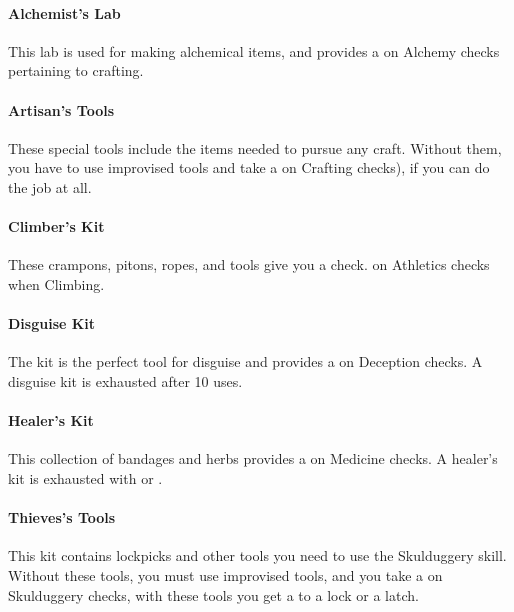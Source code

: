 \begin{multicols}{2}

\paragraph{Alchemist's Lab} \label{kititm:alchemistslab}
This lab is used for making alchemical items, and
provides a \boost on Alchemy checks pertaining to crafting.

\paragraph{Artisan's Tools} \label{kititm:artisanstools}
These special tools include the items needed to pursue
any craft. Without them, you have to use improvised
tools and take a \setback on Crafting checks), if you
can do the job at all.

\paragraph{Climber's Kit} \label{kititm:climberskit}
These crampons, pitons, ropes, and tools give you a \boost check.
on Athletics checks when Climbing.

\paragraph{Disguise Kit} \label{kititm:disguisekit}
The kit is the perfect tool for disguise and provides a \boost
on Deception checks. A disguise kit is exhausted after
10 uses.

\paragraph{Healer's Kit} \label{kititm:healerskit}
This collection of bandages and herbs provides a \boost on
Medicine checks. A healer's kit is exhausted with
\threat\threat\threat or \despair.

\paragraph{Thieves's Tools} \label{kititm:thievestools}
This kit contains lockpicks and other tools you need to
use the Skulduggery skill. Without these tools, you must
use improvised tools, and you take a \setback on Skulduggery
checks, with these tools you get a \boost to a lock or a latch.

\end{multicols}
